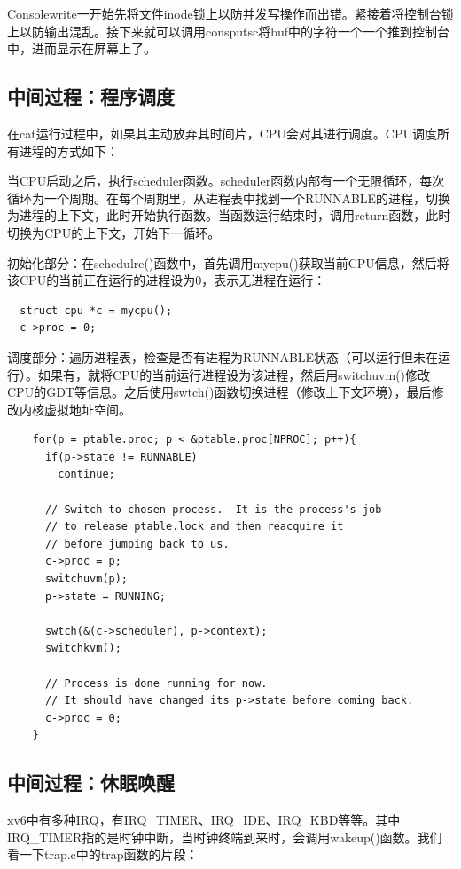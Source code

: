 Consolewrite一开始先将文件inode锁上以防并发写操作而出错。紧接着将控制台锁上以防输出混乱。接下来就可以调用consputsc将buf中的字符一个一个推到控制台中，进而显示在屏幕上了。



\subsection{中间过程：程序调度}

在cat运行过程中，如果其主动放弃其时间片，CPU会对其进行调度。CPU调度所有进程的方式如下：

当CPU启动之后，执行scheduler函数。scheduler函数内部有一个无限循环，每次循环为一个周期。在每个周期里，从进程表中找到一个RUNNABLE的进程，切换为进程的上下文，此时开始执行函数。当函数运行结束时，调用return函数，此时切换为CPU的上下文，开始下一循环。

初始化部分：在schedulre()函数中，首先调用mycpu()获取当前CPU信息，然后将该CPU的当前正在运行的进程设为0，表示无进程在运行：

\begin{verbatim}
  struct cpu *c = mycpu();
  c->proc = 0;
\end{verbatim}

调度部分：遍历进程表，检查是否有进程为RUNNABLE状态（可以运行但未在运行）。如果有，就将CPU的当前运行进程设为该进程，然后用switchuvm()修改CPU的GDT等信息。之后使用swtch()函数切换进程（修改上下文环境），最后修改内核虚拟地址空间。

\begin{verbatim}
    for(p = ptable.proc; p < &ptable.proc[NPROC]; p++){
      if(p->state != RUNNABLE)
        continue;

      // Switch to chosen process.  It is the process's job
      // to release ptable.lock and then reacquire it
      // before jumping back to us.
      c->proc = p;
      switchuvm(p);
      p->state = RUNNING;

      swtch(&(c->scheduler), p->context);
      switchkvm();

      // Process is done running for now.
      // It should have changed its p->state before coming back.
      c->proc = 0;
    }
\end{verbatim}

\subsection{中间过程：休眠唤醒}

xv6中有多种IRQ，有IRQ\_TIMER、IRQ\_IDE、IRQ\_KBD等等。其中IRQ\_TIMER指的是时钟中断，当时钟终端到来时，会调用wakeup()函数。我们看一下trap.c中的trap函数的片段：

